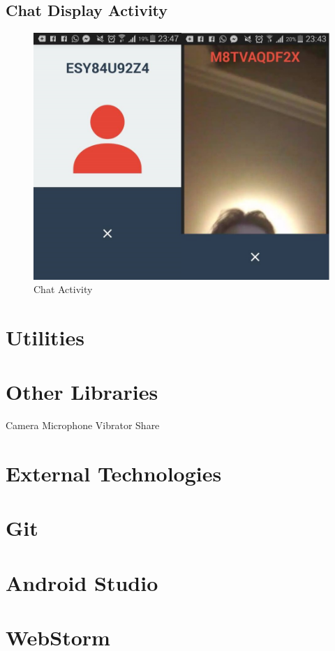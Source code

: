 \documentclass[]{report}
\begin{document}
		\subsection{Chat Display Activity}
			\begin{figure}[H]
				\caption{Chat Activity}
				\includegraphics[scale=0.35]{ChatDisplayActivity.png}
			\end{figure}
		
		\section{Utilities}
			
		\section{Other Libraries}
		Camera
		Microphone
		Vibrator
		Share
		
	\section{External Technologies}
		\section{Git}
		\section{Android Studio}
		\section{WebStorm}
		
\end{document}
